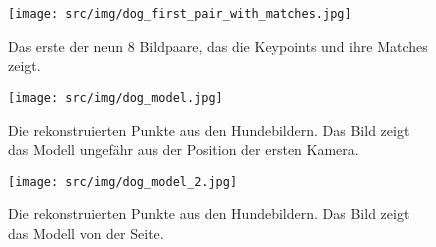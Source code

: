 \begin{figure}
    \texttt{[image: src/img/dog\_first\_pair\_with\_matches.jpg]}
    \caption{Das erste der neun 8 Bildpaare, das die Keypoints und ihre Matches zeigt.}
    \label{fig:dog-first-pair-with-matches}
\end{figure}

\begin{figure}
    \texttt{[image: src/img/dog\_model.jpg]}
    \caption{Die rekonstruierten Punkte aus den Hundebildern. Das Bild zeigt das Modell ungefähr aus der Position der ersten Kamera.}
    \label{fig:dog-model}
\end{figure}

\begin{figure}
    \texttt{[image: src/img/dog\_model\_2.jpg]}
    \caption{Die rekonstruierten Punkte aus den Hundebildern. Das Bild zeigt das Modell von der Seite.}
    \label{fig:dog-model-2}
\end{figure}
